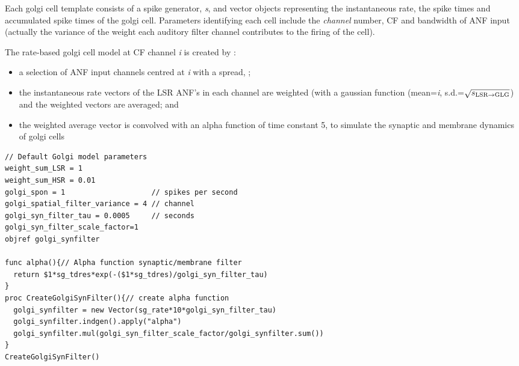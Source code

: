 Each golgi cell template consists of a spike generator, \emph{s}, and vector
objects representing the instantaneous rate, the spike times and accumulated
spike times of the golgi cell. Parameters identifying each cell include the
\emph{channel} number, CF and bandwidth of ANF input (actually the variance of
the weight each auditory filter channel contributes to the firing of the cell).

The rate-based golgi cell model at CF channel \emph{i} is
created by :
\begin{itemize}
\item a selection of ANF input channels centred at \emph{i} with a spread,
  \sLSRGLG;
\item the instantaneous rate vectors of the LSR ANF's in each channel are
  weighted (with a gaussian function (mean=\emph{i}, s.d.=$\sqrt{\protect s_{\protect\textrm{{LSR}}\to\textrm{{GLG}}}}$) and
  the weighted vectors are averaged; and
\item the weighted average vector is convolved with an alpha function of time
  constant 5, to simulate the synaptic and membrane dynamics of golgi cells
\end{itemize}

 \medskip{}

 \begin{lstlisting}[label=lstGolgiSyn,caption=Create golgi cell rate vector
   within Golgi template (in CNcell.tem)]
// Default Golgi model parameters 
weight_sum_LSR = 1
weight_sum_HSR = 0.01
golgi_spon = 1                    // spikes per second
golgi_spatial_filter_variance = 4 // channel 
golgi_syn_filter_tau = 0.0005     // seconds 
golgi_syn_filter_scale_factor=1
objref golgi_synfilter

func alpha(){// Alpha function synaptic/membrane filter 
  return $1*sg_tdres*exp(-($1*sg_tdres)/golgi_syn_filter_tau)
}
proc CreateGolgiSynFilter(){// create alpha function 
  golgi_synfilter = new Vector(sg_rate*10*golgi_syn_filter_tau)
  golgi_synfilter.indgen().apply("alpha")  
  golgi_synfilter.mul(golgi_syn_filter_scale_factor/golgi_synfilter.sum()) 
}
CreateGolgiSynFilter()
\end{lstlisting}



